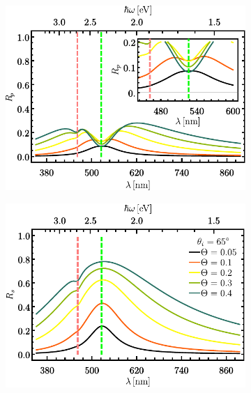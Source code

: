 	\begin{figure}[h!]\centering
	\begin{subfigure}{.01\linewidth}\caption{}\label{sfig:FSM-cutp}\vspace{3.75cm}\end{subfigure}\hspace*{-.5em}
	\begin{subfigure}{.45\linewidth}\centering \includegraphics[scale=.75 ]{2-Resultados/figs/4-Wp4FSMThetaVar/cut_angle_65_p.pdf}\end{subfigure}
	\begin{subfigure}{.01\linewidth}\caption{}\label{sfig:FSM-cuts}\vspace{3.75cm}\end{subfigure}\hspace*{-.5em}
	\begin{subfigure}{.45\linewidth}\centering \includegraphics[scale=.75 ]{2-Resultados/figs/4-Wp4FSMThetaVar/cut_angle_65_s.pdf}\end{subfigure}\vspace*{-.5em}

\end{figure}
